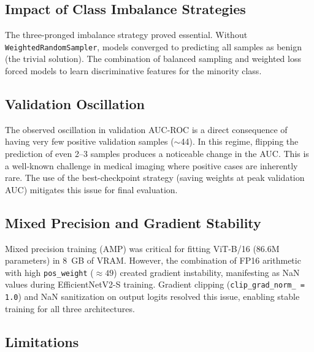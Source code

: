 \documentclass[11pt, a4paper, twocolumn]{article}
\begin{document}
\subsection{Impact of Class Imbalance Strategies}

The three-pronged imbalance strategy proved essential. Without
\texttt{WeightedRandomSampler}, models converged to predicting all
samples as benign (the trivial solution). The combination of balanced
sampling and weighted loss forced models to learn discriminative
features for the minority class.

\subsection{Validation Oscillation}

The observed oscillation in validation AUC-ROC is a direct consequence
of having very few positive validation samples ($\sim$44). In this
regime, flipping the prediction of even 2--3 samples produces a
noticeable change in the AUC. This is a well-known challenge in
medical imaging where positive cases are inherently rare. The use
of the best-checkpoint strategy (saving weights at peak validation
AUC) mitigates this issue for final evaluation.

\subsection{Mixed Precision and Gradient Stability}

Mixed precision training (AMP) was critical for fitting ViT-B/16
(86.6M parameters) in 8~GB of VRAM. However, the combination of FP16
arithmetic with high \texttt{pos\_weight} ($\approx 49$) created
gradient instability, manifesting as NaN values during
EfficientNetV2-S training. Gradient clipping
(\texttt{clip\_grad\_norm\_ = 1.0}) and NaN sanitization on output
logits resolved this issue, enabling stable training for all three
architectures.

\subsection{Limitations}
\end{document}
